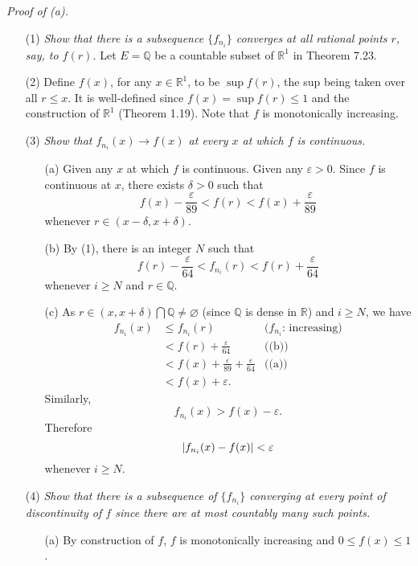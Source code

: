 \documentclass{article}
\begin{document}
\emph{Proof of (a).}
\begin{enumerate}
\item[(1)]
  \emph{Show that there is a subsequence $\{f_{n_i}\}$ converges at all rational points $r$,
  say, to $f(r)$.}
  Let $E = \mathbb{Q}$ be a countable subset of $\mathbb{R}^1$ in Theorem 7.23.

\item[(2)]
  Define $f(x)$, for any $x \in \mathbb{R}^1$, to be $\sup f(r)$,
  the sup being taken over all $r \leq x$.
  It is well-defined since $f(x) = \sup f(r) \leq 1$
  and the construction of $\mathbb{R}^1$ (Theorem 1.19).
  Note that $f$ is monotonically increasing.

\item[(3)]
  \emph{Show that $f_{n_i}(x) \to f(x)$ at every $x$ at which $f$ is continuous.}
  \begin{enumerate}
  \item[(a)]
    Given any $x$ at which $f$ is continuous.
    Given any $\varepsilon > 0$.
    Since $f$ is continuous at $x$, there exists $\delta > 0$
    such that
    \[
      f(x)-\frac{\varepsilon}{89} < f(r) < f(x)+\frac{\varepsilon}{89}
    \]
    whenever $r \in (x-\delta,x+\delta)$.

  \item[(b)]
    By (1), there is an integer $N$ such that
    \[
      f(r)-\frac{\varepsilon}{64} < f_{n_i}(r) < f(r)+\frac{\varepsilon}{64}
    \]
    whenever $i \geq N$ and $r \in \mathbb{Q}$.

  \item[(c)]
    As $r \in (x,x+\delta) \bigcap \mathbb{Q} \neq \varnothing$
    (since $\mathbb{Q}$ is dense in $\mathbb{R}$)
    and $i \geq N$, we have
      \begin{align*}
        f_{n_i}(x)
        &\leq f_{n_i}(r)
          &\text{($f_{n_i}$: increasing)} \\
        &< f(r) + \frac{\varepsilon}{64}
          &\text{((b))} \\
        &< f(x)+\frac{\varepsilon}{89} + \frac{\varepsilon}{64}
          &\text{((a))} \\
        &< f(x) + \varepsilon.
      \end{align*}
    Similarly,
    \[
      f_{n_i}(x) > f(x) - \varepsilon.
    \]
    Therefore
    \[
      \abs{ f_{n_i}(x) - f(x) } < \varepsilon
    \]
    whenever $i \geq N$.
  \end{enumerate}

\item[(4)]
  \emph{Show that there is a subsequence of $\{f_{n_i}\}$ converging
  at every point of discontinuity of $f$
  since there are at most countably many such points.}
  \begin{enumerate}
  \item[(a)]
    By construction of $f$, $f$ is monotonically increasing and $0 \leq f(x) \leq 1$.


\end{enumerate}
\end{enumerate}
\end{document}
